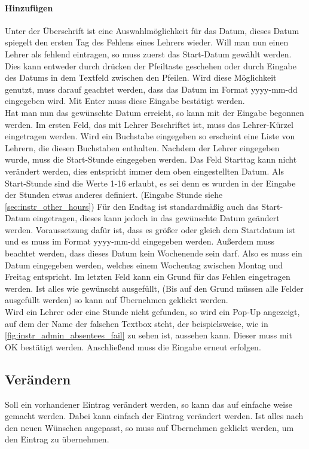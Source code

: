 \paragraph{Hinzufügen}
Unter der Überschrift ist eine Auswahlmöglichkeit für das Datum, dieses Datum spiegelt den ersten Tag des Fehlens eines Lehrers wieder. Will man nun einen Lehrer als fehlend eintragen, so muss zuerst das Start-Datum gewählt werden. Dies kann entweder durch drücken der Pfeiltaste geschehen oder durch Eingabe des Datums in dem Textfeld zwischen den Pfeilen. Wird diese Möglichkeit genutzt, muss darauf geachtet werden, dass das Datum im Format yyyy-mm-dd eingegeben wird. Mit Enter muss diese Eingabe bestätigt werden.\\
Hat man nun das gewünschte Datum erreicht, so kann mit der Eingabe begonnen werden. Im ersten Feld, das mit Lehrer Beschriftet ist, muss das Lehrer-Kürzel eingetragen werden. Wird ein Buchstabe eingegeben so erscheint eine Liste von Lehrern, die diesen Buchstaben enthalten. Nachdem der Lehrer eingegeben wurde, muss die Start-Stunde eingegeben werden. Das Feld Starttag kann nicht verändert werden, dies entspricht immer dem oben eingestellten Datum. Als Start-Stunde sind die Werte 1-16 erlaubt, es sei denn es wurden in der Eingabe der Stunden etwas anderes definiert. (Eingabe Stunde siehe \autoref{sec:instr_other_hours}) Für den Endtag ist standardmäßig auch das Start-Datum eingetragen, dieses kann jedoch in das gewünschte Datum geändert werden. Voraussetzung dafür ist, dass es größer oder gleich dem Startdatum ist und es muss im Format yyyy-mm-dd eingegeben werden. Außerdem muss beachtet werden, dass dieses Datum kein Wochenende sein darf. Also es muss ein Datum eingegeben werden, welches einem Wochentag zwischen Montag und Freitag entspricht. Im letzten Feld kann  ein Grund für das Fehlen eingetragen werden. Ist alles wie gewünscht ausgefüllt, (Bis auf den Grund müssen alle Felder ausgefüllt werden) so kann auf Übernehmen geklickt werden.\\
Wird ein Lehrer oder eine Stunde nicht gefunden, so wird ein Pop-Up angezeigt, auf dem der Name der falschen Textbox steht, der beispielsweise, wie in \autoref{fig:instr_admin_absentees_fail} zu sehen ist, aussehen kann. Dieser muss mit OK bestätigt werden. Anschließend muss die Eingabe erneut erfolgen.\
\subsection{Verändern}
Soll ein vorhandener Eintrag verändert werden, so kann das auf einfache weise gemacht werden. Dabei kann einfach der Eintrag verändert werden. Ist alles nach den neuen Wünschen angepasst, so muss auf Übernehmen geklickt werden, um den Eintrag zu übernehmen.
